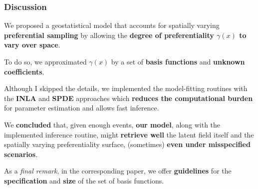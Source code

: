 \documentclass[10pt, aspectratio = 169, handout]{beamer} %
\let\oldtextbf\textbf
\renewcommand\textbf[1]{\textcolor{titles}{\oldtextbf{#1}}}
\begin{document}
     \begin{frame}[t]
        \frametitle{Discussion}
		\justifying

        We proposed a geostatistical model that accounts for spatially varying \textbf{preferential sampling} by allowing the \textbf{degree of preferentiality $\gamma(x)$ to vary over space}.

        \vspace{4pt} \pause
        
        To do so, we approximated $\gamma(x)$ by a set of \textbf{basis functions} and \hspace{2pt}\textbf{unknown coefficients}.

        \vspace{4pt} \pause

        Although I skipped the details, we implemented the model-fitting routines with the \textbf{INLA} and \textbf{SPDE} approaches which \textbf{reduces the computational burden} for parameter estimation and allows fast inference.

        \vspace{4pt} \pause

        We \textbf{concluded} that, given enough events, \textbf{our model}, along with the implemented inference routine, might \textbf{retrieve well} the latent field itself and the spatially varying preferentiality surface, (sometimes) \textbf{even under misspecified scenarios}. 

        \vspace{4pt} \pause

        As a \textit{final remark}, in the corresponding paper, we offer \textbf{guidelines} for the \textbf{specification} and \textbf{size} of the set of basis functions.
        
	\end{frame}
\end{document}
